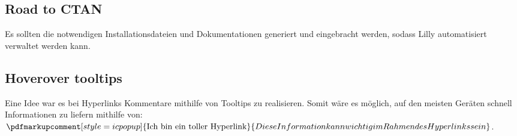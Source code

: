 \subsection{Road to CTAN}
Es sollten die notwendigen Installationsdateien und Dokumentationen generiert und eingebracht werden, sodass Lilly automatisiert verwaltet werden kann.

\subsection{Hoverover tooltips}

Eine Idee war es bei Hyperlinks Kommentare mithilfe von Tooltips zu realisieren. Somit wäre es möglich, auf den meisten Geräten schnell Informationen zu liefern mithilfe von: $\pdfmarkupcomment[style=icpopup]{\text{Ich bin ein toller Hyperlink}}{Diese Information kann wichtig im Rahmen des Hyperlinks sein}$.

